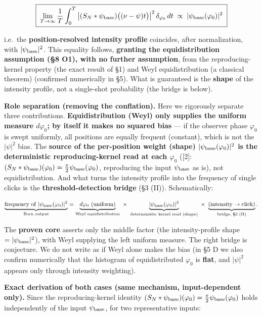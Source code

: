 \documentclass[
]{ltjsarticle}
\begin{document}
\[
\boxed{\;\lim_{T\to\infty}\frac1T\int_0^T \big|(S_N*\psi_{\rm base})\big((\nu-\psi)t\big)\big|^2\,\delta_{\varphi_0}\,dt
\;\propto\; |\psi_{\rm base}(\varphi_0)|^2\;}
\]

i.e.~the \textbf{position-resolved intensity profile} coincides, after
normalization, with \(|\psi_{\rm base}|^2\). This equality follows,
\textbf{granting the equidistribution assumption (§8 O1), with no
further assumption}, from the reproducing-kernel property (the exact
result of §1) and Weyl equidistribution (a classical theorem) (confirmed
numerically in §5). What is guaranteed is the \textbf{shape} of the
intensity profile, not a single-shot probability (the bridge is below).

\textbf{Role separation (removing the conflation).} Here we rigorously
separate three contributions. \textbf{Equidistribution (Weyl) only
supplies the uniform measure \(d\varphi_0\); by itself it makes no
squared bias} --- if the observer phase \(\varphi_0\) is swept
uniformly, all positions are equally frequent (constant), which is not
the \(|\psi|^2\) bias. The \textbf{source of the per-position weight
(shape) \(|\psi_{\rm base}(\varphi_0)|^2\) is the deterministic
reproducing-kernel read at each \(\varphi_0\)} ({[}2{]}:
\((S_N*\psi_{\rm base})(\varphi_0)=\tfrac{\pi}{2}\psi_{\rm base}(\varphi_0)\),
reproducing the input \(\psi_{\rm base}\) as is), not equidistribution.
And what turns the intensity profile into the frequency of single clicks
is the \textbf{threshold-detection bridge} (§3 (II)). Schematically:

\[
\underbrace{\text{frequency of }|\psi_{\rm base}(\varphi_0)|^2}_{\text{Born output}}
=\underbrace{d\varphi_0\ (\text{uniform})}_{\text{Weyl equidistribution}}\ \times\
\underbrace{|\psi_{\rm base}(\varphi_0)|^2}_{\text{deterministic kernel read (shape)}}\ \times\
\underbrace{(\text{intensity}\to\text{click})}_{\text{bridge, §3 (II)}}.
\]

The \textbf{proven core} asserts only the middle factor (the
intensity-profile shape \(=|\psi_{\rm base}|^2\)), with Weyl supplying
the left uniform measure. The right bridge is conjecture. We do not
write as if Weyl alone makes the bias (in §5 D we also confirm
numerically that the histogram of equidistributed \(\varphi_0\) is
\textbf{flat}, and \(|\psi|^2\) appears only through intensity
weighting).

\textbf{Exact derivation of both cases (same mechanism, input-dependent
only).} Since the reproducing-kernel identity
\((S_N*\psi_{\rm base})(\varphi_0)=\tfrac{\pi}{2}\psi_{\rm base}(\varphi_0)\)
holds independently of the input \(\psi_{\rm base}\), for two
representative inputs:
\end{document}
